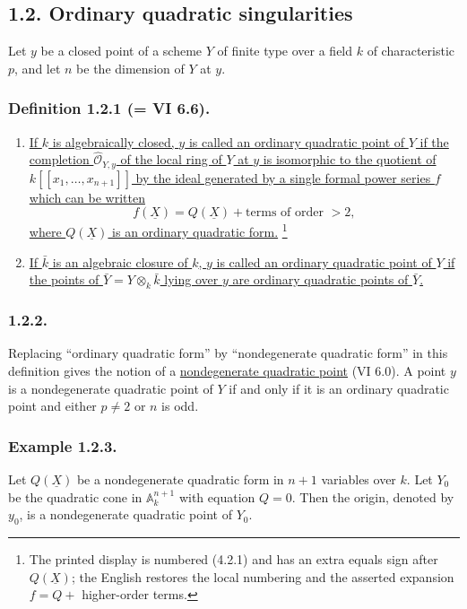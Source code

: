 \subsection*{1.2. Ordinary quadratic singularities}

Let $y$ be a closed point of a scheme $Y$ of finite type over a field
$k$ of characteristic $p$, and let $n$ be the dimension of $Y$ at
$y$.

\subsubsection*{Definition 1.2.1 (= VI 6.6).}
\begin{enumerate}[label=(\roman*),leftmargin=2.6em]
\item \underline{If $k$ is algebraically closed, $y$ is called an
ordinary quadratic point of $Y$ if the completion
$\widehat{\mathcal O}_{Y,y}$ of the local ring of $Y$ at $y$ is
isomorphic to the quotient of $k[[x_1,\ldots,x_{n+1}]]$ by the ideal
generated by a single formal power series $f$ which can be written}
\begin{equation}\tag{1.2.1.1}
f(\underline X)=Q(\underline X)+\text{terms of order }>2,
\end{equation}
\underline{where $Q(\underline X)$ is an ordinary quadratic form.}
\footnote{The printed display is numbered (4.2.1) and has an extra
equals sign after $Q(\underline X)$; the English restores the local
numbering and the asserted expansion $f=Q+$ higher-order terms.}

\item \underline{If $\bar k$ is an algebraic closure of $k$, $y$ is
called an ordinary quadratic point of $Y$ if the points of
$\bar Y=Y\otimes_k\bar k$ lying over $y$ are ordinary quadratic
points of $\bar Y$.}
\end{enumerate}

\subsubsection*{1.2.2.}
Replacing ``ordinary quadratic form'' by ``nondegenerate quadratic
form'' in this definition gives the notion of a
\underline{nondegenerate quadratic point} (VI 6.0).  A point $y$ is
a nondegenerate quadratic point of $Y$ if and only if it is an
ordinary quadratic point and either $p\ne2$ or $n$ is odd.

\subsubsection*{Example 1.2.3.}
Let $Q(\underline X)$ be a nondegenerate quadratic form in $n+1$
variables over $k$.  Let $Y_0$ be the quadratic cone in
$\mathbb A_k^{n+1}$ with equation $Q=0$.  Then the origin, denoted by
$y_0$, is a nondegenerate quadratic point of $Y_0$.

